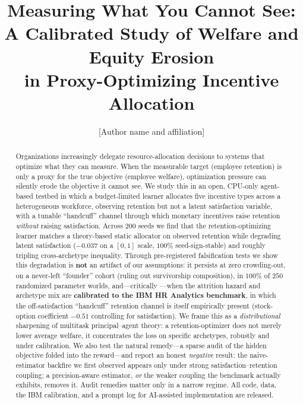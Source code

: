 \documentclass[11pt]{article}
\title{\textbf{Measuring What You Cannot See:\\ A Calibrated Study of Welfare and Equity Erosion\\ in Proxy-Optimizing Incentive Allocation}}
\author{[Author name and affiliation]}
\date{}
\begin{document}
\maketitle

\begin{abstract}
Organizations increasingly delegate resource-allocation decisions to systems that
optimize what they can measure. When the measurable target (employee retention)
is only a proxy for the true objective (employee welfare), optimization pressure
can silently erode the objective it cannot see. We study this in an open,
CPU-only agent-based testbed in which a budget-limited learner allocates five
incentive types across a heterogeneous workforce, observing retention but not a
latent satisfaction variable, with a tunable ``handcuff'' channel through which
monetary incentives raise retention \emph{without} raising satisfaction. Across
$200$ seeds we find that the retention-optimizing learner matches a theory-based
static allocator on observed retention while degrading latent satisfaction
($-0.037$ on a $[0,1]$ scale, $100\%$ seed-sign-stable) and roughly tripling
cross-archetype inequality. Through pre-registered falsification tests we show
this degradation is \textbf{not} an artifact of our assumptions: it persists at
zero crowding-out, on a never-left ``founder'' cohort (ruling out survivorship
composition), in $100\%$ of $250$ randomized parameter worlds, and---critically
---when the attrition hazard and archetype mix are \textbf{calibrated to the IBM
HR Analytics benchmark}, in which the off-satisfaction ``handcuff'' retention
channel is itself empirically present (stock-option coefficient $-0.51$
controlling for satisfaction). We frame this as a \emph{distributional}
sharpening of multitask principal--agent theory: a retention-optimizer does not
merely lower average welfare, it concentrates the loss on specific archetypes,
robustly and under calibration. We also test the natural remedy---a sparse audit
of the hidden objective folded into the reward---and report an honest
\emph{negative} result: the naive-estimator backfire we first observed appears
only under strong satisfaction--retention coupling; a precision-aware estimator,
\emph{or} the weaker coupling the benchmark actually exhibits, removes it. Audit
remedies matter only in a narrow regime. All code, data, the IBM calibration,
and a prompt log for AI-assisted implementation are released.
\end{abstract}

\end{document}
